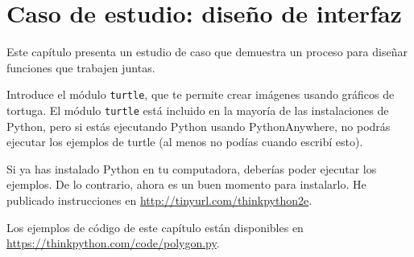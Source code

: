 
\chapter{Caso de estudio: diseño de interfaz}

Este capítulo presenta un estudio de caso que demuestra un proceso para diseñar funciones que trabajen juntas.

Introduce el módulo \texttt{turtle}, que te permite crear imágenes usando gráficos de tortuga. El módulo \texttt{turtle} está incluido en la mayoría de las instalaciones de Python, pero si estás ejecutando Python usando PythonAnywhere, no podrás ejecutar los ejemplos de turtle (al menos no podías cuando escribí esto).

Si ya has instalado Python en tu computadora, deberías poder ejecutar los ejemplos. De lo contrario, ahora es un buen momento para instalarlo. He publicado instrucciones en \url{http://tinyurl.com/thinkpython2e}.

Los ejemplos de código de este capítulo están disponibles en \url{https://thinkpython.com/code/polygon.py}.
